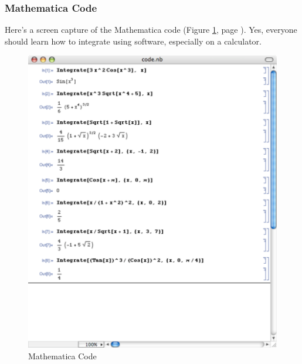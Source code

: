 \documentclass[12pt,addpoints, answers, fleqn]{exam}
\begin{document}
\vfill
\pagebreak

\subsubsection{Mathematica Code}

Here's a screen capture of the Mathematica code (Figure \ref{fig:code}, page \pageref{fig:code}). Yes, everyone should learn how to integrate using software, especially on a calculator.

\begin{figure}[htbp] %
   \centering
   \includegraphics[width=5.5in]{./graphics/code.pdf} 
   \caption{Mathematica Code}
   \label{fig:code}
\end{figure}
\vfill
\pagebreak
\end{document}
